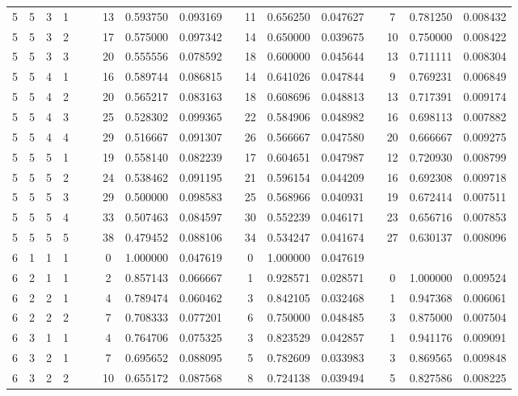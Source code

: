 \begin{appendix}
\begin{longtable}[h]{rrrcccccccccccccc}
5	&	5	&	3	&	1	&&&	13	&	0.593750	&	0.093169	&&	11	&	0.656250	&	0.047627	&&	7	&	0.781250	&	0.008432	\\
5	&	5	&	3	&	2	&&&	17	&	0.575000	&	0.097342	&&	14	&	0.650000	&	0.039675	&&	10	&	0.750000	&	0.008422	\\
5	&	5	&	3	&	3	&&&	20	&	0.555556	&	0.078592	&&	18	&	0.600000	&	0.045644	&&	13	&	0.711111	&	0.008304	\\
5	&	5	&	4	&	1	&&&	16	&	0.589744	&	0.086815	&&	14	&	0.641026	&	0.047844	&&	9	&	0.769231	&	0.006849	\\
5	&	5	&	4	&	2	&&&	20	&	0.565217	&	0.083163	&&	18	&	0.608696	&	0.048813	&&	13	&	0.717391	&	0.009174	\\
5	&	5	&	4	&	3	&&&	25	&	0.528302	&	0.099365	&&	22	&	0.584906	&	0.048982	&&	16	&	0.698113	&	0.007882	\\
5	&	5	&	4	&	4	&&&	29	&	0.516667	&	0.091307	&&	26	&	0.566667	&	0.047580	&&	20	&	0.666667	&	0.009275	\\
5	&	5	&	5	&	1	&&&	19	&	0.558140	&	0.082239	&&	17	&	0.604651	&	0.047987	&&	12	&	0.720930	&	0.008799	\\
5	&	5	&	5	&	2	&&&	24	&	0.538462	&	0.091195	&&	21	&	0.596154	&	0.044209	&&	16	&	0.692308	&	0.009718	\\
5	&	5	&	5	&	3	&&&	29	&	0.500000	&	0.098583	&&	25	&	0.568966	&	0.040931	&&	19	&	0.672414	&	0.007511	\\
5	&	5	&	5	&	4	&&&	33	&	0.507463	&	0.084597	&&	30	&	0.552239	&	0.046171	&&	23	&	0.656716	&	0.007853	\\
5	&	5	&	5	&	5	&&&	38	&	0.479452	&	0.088106	&&	34	&	0.534247	&	0.041674	&&	27	&	0.630137	&	0.008096	\\
6	&	1	&	1	&	1	&&&	0	&	1.000000	&	0.047619	&&	0	&	1.000000	&	0.047619	&&		&		&		\\
6	&	2	&	1	&	1	&&&	2	&	0.857143	&	0.066667	&&	1	&	0.928571	&	0.028571	&&	0	&	1.000000	&	0.009524	\\
6	&	2	&	2	&	1	&&&	4	&	0.789474	&	0.060462	&&	3	&	0.842105	&	0.032468	&&	1	&	0.947368	&	0.006061	\\
6	&	2	&	2	&	2	&&&	7	&	0.708333	&	0.077201	&&	6	&	0.750000	&	0.048485	&&	3	&	0.875000	&	0.007504	\\
6	&	3	&	1	&	1	&&&	4	&	0.764706	&	0.075325	&&	3	&	0.823529	&	0.042857	&&	1	&	0.941176	&	0.009091	\\
6	&	3	&	2	&	1	&&&	7	&	0.695652	&	0.088095	&&	5	&	0.782609	&	0.033983	&&	3	&	0.869565	&	0.009848	\\
6	&	3	&	2	&	2	&&&	10	&	0.655172	&	0.087568	&&	8	&	0.724138	&	0.039494	&&	5	&	0.827586	&	0.008225	\\

\end{longtable}
\end{appendix}
